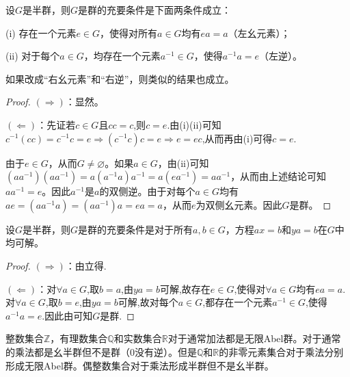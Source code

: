 \documentclass[../../main.tex]{subfiles}
\begin{document}
\begin{proposition}\label{proposition:半群是群的充要条件}
设$G$是半群，则$G$是群的充要条件是下面两条件成立：

(i) 存在一个元素$e \in G$，使得对所有$a \in G$均有$ea = a$（左幺元素）；

(ii) 对于每个$a \in G$，均存在一个元素$a^{-1} \in G$，使得$a^{-1}a = e$（左逆）。
\end{proposition}
\begin{remark}
如果改成“右幺元素”和“右逆”，则类似的结果也成立。
\end{remark}
\begin{proof}
$(\Rightarrow)$：显然。

$(\Leftarrow)$：先证若$c\in G$且$cc=c$,则$c=e$.由(i)(ii)可知$c^{-1}(cc)=c^{-1}c=e\Rightarrow (c^{-1}c)c=e\Rightarrow e=ec$,从而再由(i)可得$c=e$.

由于$e \in G$，从而$G \neq \varnothing$。如果$a \in G$，由(ii)可知$(aa^{-1})(aa^{-1}) = a (a^{-1}a) a^{-1} = a(ea^{-1}) = aa^{-1}$，从而由上述结论可知$aa^{-1} = e$。因此$a^{-1}$是$a$的双侧逆。由于对每个$a \in G$均有$ae = (aa^{-1}a) = (aa^{-1}) a = ea = a$，从而$e$为双侧幺元素。因此$G$是群。
\end{proof}

\begin{proposition}
设$G$是半群，则$G$是群的充要条件是对于所有$a, b \in G$，方程$ax = b$和$ya = b$在$G$中均可解。
\end{proposition}
\begin{proof}
$(\Rightarrow)$：由立得.

$(\Leftarrow)$：对$\forall a\in G$,取$b=a$,由$ya=b$可解,故存在$e\in G$,使得对$\forall a\in G$均有$ea=a$.
对$\forall a\in G$,取$b=e$,由$ya=b$可解,故对每个$a\in G$,都存在一个元素$a^{-1}\in G$,使得$a^{-1}a=e$.因此由可知$G$是群.
\end{proof}

\begin{example}
整数集合$\mathbb{Z}$，有理数集合$\mathbb{Q}$和实数集合$\mathbb{R}$对于通常加法都是无限Abel群。对于通常的乘法都是幺半群但不是群（$0$没有逆）。但是$\mathbb{Q}$和$\mathbb{R}$的非零元素集合对于乘法分别形成无限Abel群。偶整数集合对于乘法形成半群但不是幺半群。
\end{example}
\end{document}
